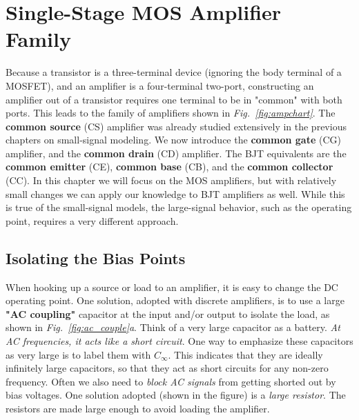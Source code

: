\section{Single-Stage MOS Amplifier Family}
Because a transistor is a three-terminal device (ignoring the body terminal of a MOSFET), and an amplifier is a four-terminal two-port, constructing an amplifier out of a transistor requires one terminal to be in "common" with both ports.  This leads to the family of amplifiers shown in \emph{Fig.~\ref{fig:ampchart}}.  The \textbf{common source} (CS) amplifier was already studied extensively in the previous chapters on small-signal modeling.  We now introduce the \textbf{common gate} (CG) amplifier, and the \textbf{common drain} (CD) amplifier.  The BJT equivalents are the \textbf{common emitter} (CE), \textbf{common base} (CB), and the \textbf{common collector} (CC).  In this chapter we will focus on the MOS amplifiers, but with relatively small changes we can apply our knowledge to BJT amplifiers as well.  While this is true of the small-signal models, the large-signal behavior, such as the operating point, requires a very different approach.
\subsection{Isolating the Bias Points}
When hooking up a source or load to an amplifier, it is easy to change the DC operating point.  One solution, adopted with discrete amplifiers, is to use a large \textbf{"AC coupling"} capacitor at the input and/or output to isolate the load, as shown in \emph{Fig.~\ref{fig:ac_couple}a}. Think of a very large capacitor as a battery. \textit{At AC frequencies, it acts like a short circuit}.  One way to emphasize these capacitors as very large is to label them with $C_\infty$. This indicates that they are ideally infinitely large capacitors, so that they act as short circuits for any non-zero frequency.  Often we also need to \textit{block AC signals} from getting shorted out by bias voltages.  One solution adopted (shown in the figure) is a \textit{large resistor}.  The resistors are made large enough to avoid loading the amplifier.
